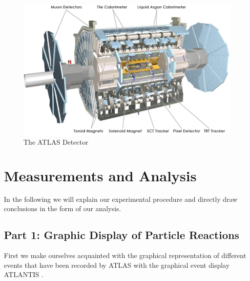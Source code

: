 \documentclass[11pt,a4paper,notitlepage]{scrartcl}
\begin{document}
\begin{figure}
	\includegraphics[width=\linewidth]{P1_pics/schematics/ATLAS.png}
	\caption{The ATLAS Detector \cite{ATLAS_detector}}\label{fig:ATLAS}
\end{figure}
\newpage
\section{Measurements and Analysis}
\label{sec:anal}
In the following we will explain our experimental procedure and directly draw conclusions in the form of our analysis.
\subsection{Part 1: Graphic Display of Particle Reactions}
First we make ourselves acquainted with the graphical representation of different events that have been recorded by ATLAS with the graphical event display ATLANTIS \cite{atlantis}. 
\end{document}
